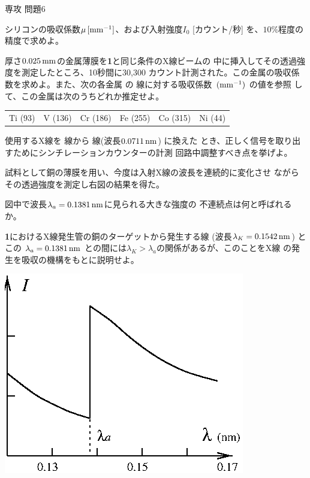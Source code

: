 \documentclass[fleqn]{jbook}
\begin{document}
\begin{question}{専攻 問題6}{}
\begin{subquestions}
\begin{subsubquestions}
  \SubSubQuestion
    シリコンの吸収係数$\mu \,{\rm [mm^{-1}]}$、および入射強度$I_{0}$
    [カウント/秒] を、$10\%$程度の精度で求めよ。

  \SubSubQuestion
    厚さ$0.025\,{\rm mm}$の金属薄膜を{\bf 1}と同じ条件のX線ビームの
    中に挿入してその透過強度を測定したところ、10秒間に30,300
    カウント計測された。この金属の吸収係数を求めよ。また、次の各金属
    の \CuK 線に対する吸収係数 $\,{\rm (mm^{-1})}$ の値を参照
    して、この金属は次のうちどれか推定せよ。
%
    \begin{center}
    \begin{tabular}{llllll}%
      Ti (93) &  V (136) & Cr (186) & Fe (255) &  Co (315) & Ni (44) \\
    \end{tabular}%
    \end{center}
  \end{subsubquestions}

\SubQuestion
  使用するX線を \CuK 線から \MoK 線(波長$0.0711\,{\rm nm}$) に換えた
  とき、正しく信号を取り出すためにシンチレーションカウンターの計測
  回路中調整すべき点を挙げよ。

\SubQuestion
  \parbox[t]{103mm}{
  試料として銅の薄膜を用い、今度は入射X線の波長を連続的に変化させ
  ながらその透過強度を測定し右図の結果を得た。

  \begin{subsubquestions}
  \SubSubQuestion
    図中で波長$\lambda_{a}=0.1381\,{\rm nm}$に見られる大きな強度の
    不連続点は何と呼ばれるか。

  \SubSubQuestion
    {\bf 1}におけるX線発生管の銅のターゲットから発生する\CuK 線
    (波長$\lambda_{K}=0.1542\,{\rm nm}$) とこの
    $\lambda_{a}=0.1381\,{\rm nm}$
    との間には$\lambda_{K}>\lambda_{a}$の関係があるが、このことをX線
    の発生を吸収の機構をもとに説明せよ。

  \end{subsubquestions}

  }\parbox[t]{58mm}{
  \begin{center}
    \mbox{\includegraphics[clip]{1994phy6-2.eps}}
  \end{center}}

\end{subquestions}
\end{question}
\end{document}
